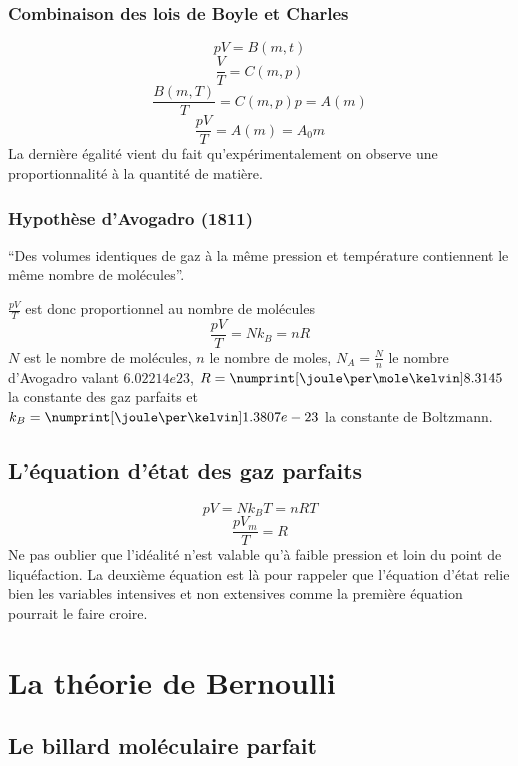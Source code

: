 \subsubsection{Combinaison des lois de Boyle et Charles}
\[ pV = B(m,t) \]
\[ \frac{V}{T} = C(m,p) \]
\[ \frac{B(m,T)}{T} = C(m,p)p = A(m) \]
\[ \frac{pV}{T} = A(m) = A_0m \]
La dernière égalité vient du fait qu'expérimentalement on observe
une proportionnalité à la quantité de matière.

\subsubsection{Hypothèse d'Avogadro (1811)}
``Des volumes identiques de gaz à la même pression et
température contiennent le même nombre de molécules''.

$\frac{pV}{T}$ est donc proportionnel au nombre de molécules
\[ \frac{pV}{T} = Nk_B = nR \]
$N$ est le nombre de molécules,
$n$ le nombre de moles,
$N_A = \frac{N}{n}$ le nombre d'Avogadro valant $\si{6.02214e23}{}$,
$R = \si{8.3145}{\joule\per\mole\kelvin}$ la constante des gaz parfaits et
$k_B = \si{1.3807e-23}{\joule\per\kelvin}$ la constante de Boltzmann.

\subsection{L'équation d'état des gaz parfaits}
\[ pV = Nk_BT = nRT \]
\[ \frac{pV_m}{T} = R \]
Ne pas oublier que l'idéalité n'est valable qu'à faible pression et
loin du point de liquéfaction.
La deuxième équation est là pour rappeler que l'équation d'état relie bien
les variables intensives et non extensives comme la première équation pourrait
le faire croire.

\section{La théorie de Bernoulli}
\subsection{Le billard moléculaire parfait}
